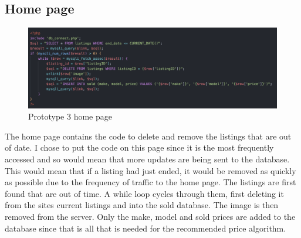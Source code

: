 \subsection{Home page}
\begin{figure}[H]
    \centering
    \includegraphics[scale=0.5]{ch3_developing/proto3/home.png}
    \caption{Prototype 3 home page}
    \label{fig:proto3_home}
\end{figure}
The home page contains the code to delete and remove the listings that are out of date. I chose to put the code on this page since it is the most frequently accessed and so would mean that more updates are being sent to the database. This would mean that if a listing had just ended, it would be removed as quickly as possible due to the frequency of traffic to the home page. The listings are first found that are out of time. A while loop cycles through them, first deleting it from the sites current listings and into the sold database. The image is then removed from the server. Only the make, model and sold prices are added to the database since that is all that is needed for the recommended price algorithm. 
